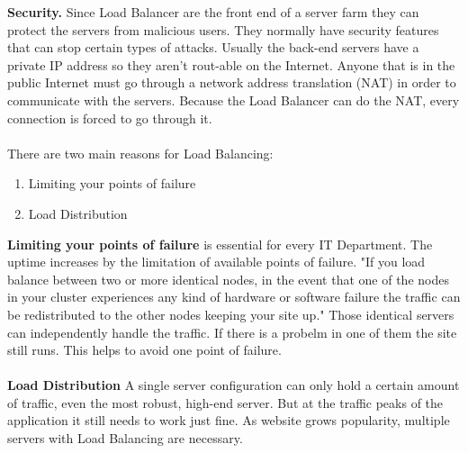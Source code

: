 \documentclass[12p]{article}
\begin{document}
	\textbf{Security.} Since Load Balancer are the front end of a server farm they can protect the servers from malicious users. They normally have security features that can stop certain types of attacks. Usually the back-end servers have a private IP address so they aren't rout-able on the Internet. Anyone that is in the public Internet must go through a network address translation (NAT) in order to communicate with the servers. Because the Load Balancer can do the NAT, every connection is forced to go through it.\cite{lb_SFC} \\\\
	There are two main reasons for Load Balancing:
	\begin{enumerate}
		\item Limiting your points of failure
		\item Load Distribution
	\end{enumerate} 
	\textbf{Limiting your points of failure} is essential for every IT Department. The uptime increases by the limitation of available points of failure. "If you load balance between two or more identical nodes, in the event that one of the nodes in your cluster experiences any kind of hardware or software failure the traffic can be redistributed to the other nodes keeping your site up." \cite{liquidweb} Those identical servers can independently handle the traffic. If there is a probelm in one of them the site still runs. This helps to avoid one point of failure. 
	\\\\
	\textbf{Load Distribution} 
	A single server configuration can only hold a certain amount of traffic, even the most robust, high-end server. But at the traffic peaks of the application it still needs to work just fine. As website grows popularity, multiple servers with Load Balancing are necessary. \cite{liquidweb}
			
\end{document}
